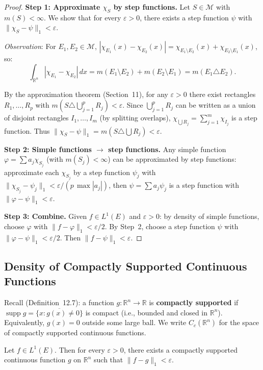\documentclass[11pt]{report}
\begin{document}
\begin{proof}
\textbf{Step 1: Approximate $\chi_S$ by step functions.} Let $S \in \mathcal{M}$ with $m(S) < \infty$. We show that for every $\varepsilon > 0$, there exists a step function $\psi$ with $\|\chi_S - \psi\|_1 < \varepsilon$.

\textit{Observation}: For $E_1, E_2 \in \mathcal{M}$, $|\chi_{E_1}(x) - \chi_{E_2}(x)| = \chi_{E_1 \setminus E_2}(x) + \chi_{E_2 \setminus E_1}(x)$, so:
\[
\int_{\mathbb{R}^n} |\chi_{E_1} - \chi_{E_2}|\,dx = m(E_1 \setminus E_2) + m(E_2 \setminus E_1) = m(E_1 \triangle E_2).
\]

By the approximation theorem (Section~11), for any $\varepsilon > 0$ there exist rectangles $R_1, \ldots, R_p$ with $m(S \triangle \bigcup_{j=1}^p R_j) < \varepsilon$. Since $\bigcup_{j=1}^p R_j$ can be written as a union of disjoint rectangles $I_1, \ldots, I_m$ (by splitting overlaps), $\chi_{\bigcup R_j} = \sum_{j=1}^{m} \chi_{I_j}$ is a step function. Thus $\|\chi_S - \psi\|_1 = m(S \triangle \bigcup R_j) < \varepsilon$.

\textbf{Step 2: Simple functions $\to$ step functions.} Any simple function $\varphi = \sum a_j \chi_{S_j}$ (with $m(S_j) < \infty$) can be approximated by step functions: approximate each $\chi_{S_j}$ by a step function $\psi_j$ with $\|\chi_{S_j} - \psi_j\|_1 < \varepsilon/(p\,\max|a_j|)$, then $\psi = \sum a_j \psi_j$ is a step function with $\|\varphi - \psi\|_1 < \varepsilon$.

\textbf{Step 3: Combine.} Given $f \in L^1(E)$ and $\varepsilon > 0$: by density of simple functions, choose $\varphi$ with $\|f - \varphi\|_1 < \varepsilon/2$. By Step~2, choose a step function $\psi$ with $\|\varphi - \psi\|_1 < \varepsilon/2$. Then $\|f - \psi\|_1 < \varepsilon$.
\end{proof}

\subsection{Density of Compactly Supported Continuous Functions}

Recall (Definition~12.7): a function $g: \mathbb{R}^n \to \mathbb{R}$ is \textbf{compactly supported} if $\operatorname{supp} g = \overline{\{x : g(x) \neq 0\}}$ is compact (i.e., bounded and closed in $\mathbb{R}^n$). Equivalently, $g(x) = 0$ outside some large ball. We write $C_c(\mathbb{R}^n)$ for the space of compactly supported continuous functions.

\begin{thmbox}
Let $f \in L^1(E)$. Then for every $\varepsilon > 0$, there exists a compactly supported continuous function $g$ on $\mathbb{R}^n$ such that $\|f - g\|_1 < \varepsilon$.
\end{thmbox}
\end{document}
